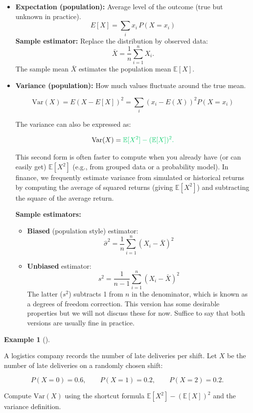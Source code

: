 \documentclass[
  12pt,
  letterpaper,
]{scrbook}
\providecommand{\tightlist}{%
  \setlength{\itemsep}{0pt}\setlength{\parskip}{0pt}}
\renewcommand{\tightlist}{\setlength{\itemsep}{0.5\baselineskip}\setlength{\parskip}{0.2\baselineskip}}
\theoremstyle{plain}
\theoremstyle{definition}
\newtheorem{example}{Example}[chapter]
\theoremstyle{remark}
\begin{document}
\begin{itemize}
\item
  \textbf{Expectation (population):} Average level of the outcome (true
  but unknown in practice). \[
  E[X] = \sum_{i} x_i \, P(X = x_i)
  \] \textbf{Sample estimator:} Replace the distribution by observed
  data: \[\bar{X} = \dfrac{1}{n}\sum_{i=1}^n X_i.\] The sample mean
  \(\bar{X}\) estimates the population mean \(\mathbb{E}[X]\).
\item
  \textbf{Variance (population):} How much values fluctuate around the
  true mean.

  \[\text{Var}(X) = E(X - E[X])^2 = \sum_{i} (x_i-E(X))^2 P(X=x_i)\]

  The variance can also be expressed as:

  \[
  \text{Var}(X) = \color[HTML]{00CC66}{\mathbb{E}[X^2] - (\mathbb{E}[X])^2}.
  \]

  This second form is often faster to compute when you already have (or
  can easily get) \(\mathbb{E}[X^2]\) (e.g., from grouped data or a
  probability model). In finance, we frequently estimate variance from
  simulated or historical returns by computing the average of squared
  returns (giving \(\mathbb{E}[X^2]\)) and subtracting the square of the
  average return.

  \textbf{Sample estimators:}

  \begin{itemize}
  \tightlist
  \item
    \textbf{Biased} (population style) estimator:
    \[ \hat{\sigma}^2 = \dfrac{1}{n}\sum_{i=1}^n (X_i - \bar{X})^2 \]
  \item
    \textbf{Unbiased} estimator:
    \[s^2 = \dfrac{1}{n-1}\sum_{i=1}^n (X_i - \bar{X})^2 \] The latter
    (\(s^2\)) subtracts 1 from \(n\) in the denominator, which is known
    as a {degrees of freedom correction}. This version has some
    desirable properties but we will not discuss these for now. Suffice
    to say that both versions are usually fine in practice.
  \end{itemize}
\end{itemize}

\begin{example}[]\protect\hypertarget{exm-10}{}\label{exm-10}

A logistics company records the number of late deliveries per shift. Let
\(X\) be the number of late deliveries on a randomly chosen shift:

\[
P(X=0)=0.6, \qquad P(X=1)=0.2, \qquad P(X=2)=0.2.
\]

Compute \(\text{Var}(X)\) using the shortcut formula
\(\mathbb{E}[X^2] - (\mathbb{E}[X])^2\) and the variance definition.

\end{example}
\end{document}
